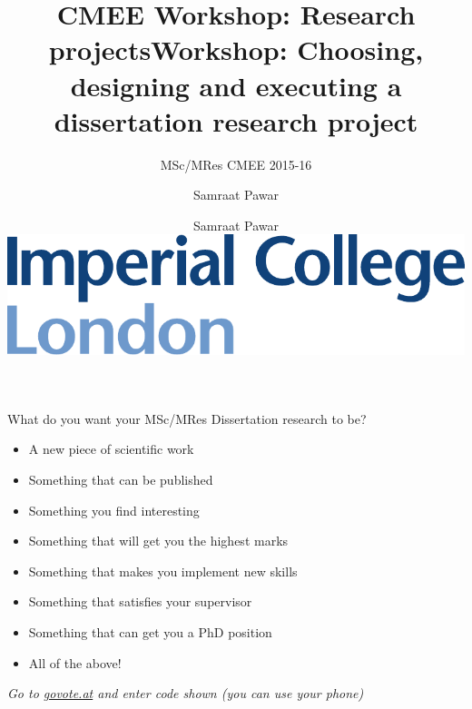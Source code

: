 \documentclass[xcolor=x11names,compress]{beamer}
\title{CMEE Workshop: Research projects}
\author{Samraat Pawar}
\renewcommand{\(}{\begin{columns}}
\renewcommand{\)}{\end{columns}}
\newcommand{\<}[1]{\begin{column}{#1}}
\renewcommand{\>}{\end{column}}
\begin{document}
\begin{frame}[plain]

\title{Workshop: Choosing, designing and executing a dissertation research project}
\vspace{12pt}
\subtitle{MSc/MRes CMEE 2015-16}
\author{
    Samraat Pawar\\
    \vspace{20pt}
  \centering
  \includegraphics[height = .3in]{Imperial_Color1.pdf}
}
 
\titlepage
\end{frame}

\begin{frame}{What do you want your MSc/MRes Dissertation research to be?}

  \begin{itemize}[<+->] \itemsep8pt
    \item A new piece of scientific work
    \item Something that can be published
    \item Something you find interesting
    \item Something that will get you the highest marks
    \item Something that makes you implement new skills
    \item Something that satisfies your supervisor
    \item Something that can get you a PhD position
    \item All of the above!
 \end{itemize}

\vspace*{6pt}

\pause
\centering 

{\it Go to \url{govote.at} and enter code shown (you can use your phone)}

\end{frame}
\end{document}
